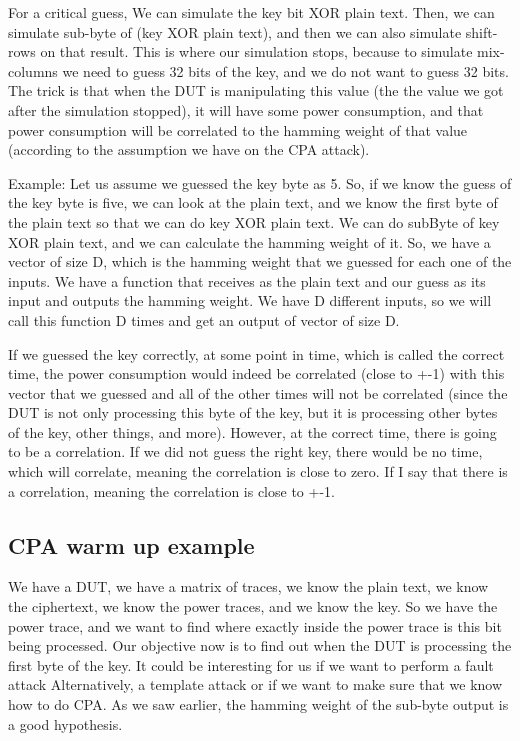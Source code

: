For a critical guess, We can simulate the key bit XOR plain text. Then, we can
simulate sub-byte of (key XOR plain text), and then we can also simulate
shift-rows on that result. This is where our simulation stops, because to
simulate mix-columns we need to guess 32 bits of the key, and we do not want to
guess 32 bits. The trick is that when the DUT is manipulating this value (the
the value we got after the simulation stopped), it will have some power consumption,
and that power consumption will be correlated to the hamming weight of that
value (according to the assumption we have on the CPA attack). 

Example: Let us assume we guessed the key byte as 5. So, if we know the guess of
the key byte is five, we can look at the plain text, and we know the first byte of
the plain text so that we can do key XOR plain text. We can do subByte of key XOR
plain text, and we can calculate the hamming weight of it. So, we have a vector
of size D, which is the hamming weight that we guessed for each one of the
inputs. We have a function that receives as the plain text and our guess as its input
and outputs the hamming weight. We have D different inputs, so we will call this
function D times and get an output of vector of size D. 

If we guessed the key correctly, at some point in time, which is called the
correct time, the power consumption would indeed be correlated (close to +-1)
with this vector that we guessed and all of the other times will not be
correlated (since the DUT is not only processing this byte of the key, but it is
processing other bytes of the key, other things, and more). However, at the correct
time, there is going to be a correlation. If we did not guess the right key,
there would be no time, which will correlate, meaning the correlation is
close to zero. If I say that there is a correlation, meaning the correlation is
close to +-1. 

\subsection{CPA warm up example}\label{c8_CPA_warm_up_example:subsec}

We have a DUT, we have a matrix of traces, we know the plain text, we know the
ciphertext, we know the power traces, and we know the key. So we have the power
trace, and we want to find where exactly inside the power trace is this bit being
processed. Our objective now is to find out when the DUT is processing the first
byte of the key. It could be interesting for us if we want to perform a fault attack \cite{FaultAttack}
Alternatively, a template attack \cite{TemplateAttack} or if we want to make sure that we know how to do CPA.
As we saw earlier, the hamming weight of the sub-byte output is a good
hypothesis.

